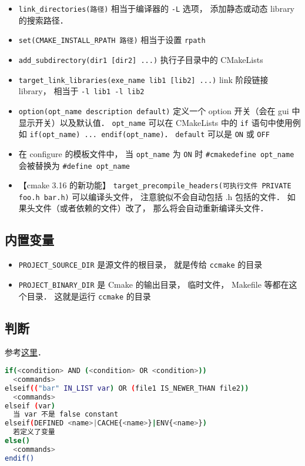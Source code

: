 \begin{itemize}
\item \verb|link_directories(路径)| 相当于编译器的 \verb`-L` 选项， 添加静态或动态 library 的搜索路径．
\item \verb|set(CMAKE_INSTALL_RPATH 路径)| 相当于设置 \verb|rpath|
\item \verb`add_subdirectory(dir1 [dir2] ...)` 执行子目录中的 CMakeLists
\item \verb`target_link_libraries(exe_name lib1 [lib2] ...)` link 阶段链接 library， 相当于 \verb|-l lib1 -l lib2|
\item \verb`option(opt_name description default)` 定义一个 option 开关（会在 gui 中显示开关）以及默认值． \verb`opt_name` 可以在 CMakeLists 中的 \verb`if` 语句中使用例如 \verb`if(opt_name) ... endif(opt_name)`． \verb`default` 可以是 \verb`ON` 或 \verb`OFF`
\item 在 configure 的模板文件中， 当 \verb`opt_name` 为 \verb`ON` 时 \verb`#cmakedefine opt_name` 会被替换为 \verb`#define opt_name`
\item 【cmake 3.16 的新功能】 \verb|target_precompile_headers(可执行文件 PRIVATE foo.h bar.h)| 可以编译头文件， 注意貌似不会自动包括 .h 包括的文件． 如果头文件（或者依赖的文件）改了， 那么将会自动重新编译头文件．
\end{itemize}

\subsection{内置变量}
\begin{itemize}
\item \verb`PROJECT_SOURCE_DIR` 是源文件的根目录， 就是传给 \verb`ccmake` 的目录
\item \verb`PROJECT_BINARY_DIR` 是 Cmake 的输出目录， 临时文件， Makefile 等都在这个目录． 这就是运行 \verb`ccmake` 的目录
\end{itemize}

\subsection{判断}
参考\href{https://cmake.org/cmake/help/latest/command/if.html}{这里}．
\begin{lstlisting}[language=bash]
if(<condition> AND (<condition> OR <condition>))
  <commands>
elseif(("bar" IN_LIST var) OR (file1 IS_NEWER_THAN file2))
  <commands>
elseif (var)
  当 var 不是 false constant
elseif(DEFINED <name>|CACHE{<name>}|ENV{<name>})
  若定义了变量
else()
  <commands>
endif()
\end{lstlisting}

